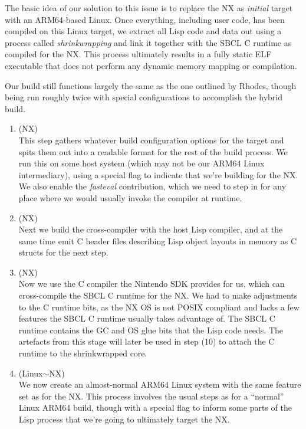 \documentclass[format=sigconf]{acmart}
\begin{document}
The basic idea of our solution to this issue is to replace the NX as \textit{initial} target with an ARM64-based Linux. Once everything, including user code, has been compiled on this Linux target, we extract all Lisp code and data out using a process called \textit{shrinkwrapping} and link it together with the SBCL C runtime as compiled for the NX. This process ultimately results in a fully static ELF executable that does not perform any dynamic memory mapping or compilation.

Our build still functions largely the same as the one outlined by Rhodes\cite{rhodes2008sbcl}, though being run roughly twice with special configurations to accomplish the hybrid build.

\begin{enumerate}
\item {} (NX) \\
  This step gathers whatever build configuration options for the target and spits them out into a readable format for the rest of the build process. We run this on some host system (which may not be our ARM64 Linux intermediary), using a special flag to indicate that we're building for the NX. We also enable the \textit{fasteval} contribution, which we need to step in for any place where we would usually invoke the compiler at runtime.
\item {} (NX) \\
  Next we build the cross-compiler with the host Lisp compiler, and at the same time emit C header files describing Lisp object layouts in memory as C structs for the next step.
\item {} (NX) \\
  Now we use the C compiler the Nintendo SDK provides for us, which can cross-compile the SBCL C runtime for the NX. We had to make adjustments to the C runtime bits, as the NX OS is not POSIX compliant and lacks a few features the SBCL C runtime usually takes advantage of. The SBCL C runtime contains the GC and OS glue bits that the Lisp code needs. The artefacts from this stage will later be used in step (10) to attach the C runtime to the shrinkwrapped core.
\item {} (Linux$\sim$NX) \\
  We now create an almost-normal ARM64 Linux system with the same feature set as for the NX. This process involves the usual steps as for a ``normal'' Linux ARM64 build, though with a special flag to inform some parts of the Lisp process that we're going to ultimately target the NX.

\end{enumerate}
\end{document}
